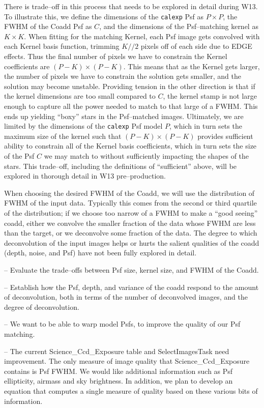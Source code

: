 \documentclass[12pt]{article}
\begin{document}
There is trade--off in this process that needs to be explored in
detail during W13.  To illustrate this, we define the dimensions of
the {\tt calexp} Psf as $P \times P$, the FWHM of the Coadd Psf as
$C$, and the dimensions of the Psf--matching kernel as $K \times K$.
When fitting for the matching Kernel, each Psf image gets convolved
with each Kernel basis function, trimming $K//2$ pixels off of each
side due to EDGE effects.  Thus the final number of pixels we have to
constrain the Kernel coefficients are $(P-K) \times (P-K)$.  This
means that as the Kernel gets larger, the number of pixels we have to
constrain the solution gets smaller, and the solution may become
unstable.  Providing tension in the other direction is that if the
kernel dimensions are too small compared to $C$, the kernel stamp is
not large enough to capture all the power needed to match to that
large of a FWHM.  This ends up yielding ``boxy'' stars in the
Psf--matched images.  Ultimately, we are limited by the dimensions of
the {\tt calexp} Psf model $P$, which in turn sets the maximum size of
the kernel such that $(P-K) \times (P-K)$ provides sufficient ability
to constrain all of the Kernel basis coefficients, which in turn sets
the size of the Psf $C$ we may match to without sufficiently impacting
the shapes of the stars.  This trade--off, including the definitions
of ``sufficient'' above, will be explored in thorough detail in W13
pre--production.

When choosing the desired FWHM of the Coadd, we will use the
distribution of FWHM of the input data.  Typically this comes from the
second or third quartile of the distribution; if we choose too narrow
of a FWHM to make a ``good seeing'' coadd, either we convolve the
smaller fraction of the data whose FWHM are less than the target, or
we deconvolve some fraction of the data.  The degree to which
deconvolution of the input images helps or hurts the salient qualities
of the coadd (depth, noise, and Psf) have not been fully explored in
detail.

-- Evaluate the trade--offs between Psf size, kernel size, and FWHM
of the Coadd.

-- Establish how the Psf, depth, and variance of the coadd respond to
the amount of deconvolution, both in terms of the number of
deconvolved images, and the degree of deconvolution.

-- We want to be able to warp model Psfs, to improve the quality of our Psf matching.

-- The current Science\_Ccd\_Exposure table and SelectImagesTask need improvement.
The only measure of image quality that Science\_Ccd\_Exposure contains is Psf FWHM.
We would like additional information such as Psf ellipticity, airmass and sky brightness.
In addition, we plan to develop an equation that computes a single measure of quality
based on these various bits of information.
\end{document}

